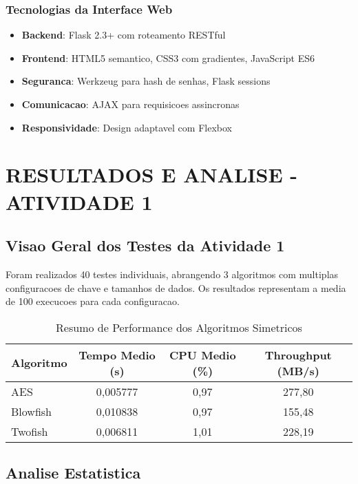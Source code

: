 \documentclass[12pt,a4paper,oneside]{article}
\begin{document}
\subsubsection{Tecnologias da Interface Web}

\begin{itemize}
    \item \textbf{Backend}: Flask 2.3+ com roteamento RESTful
    \item \textbf{Frontend}: HTML5 semantico, CSS3 com gradientes, JavaScript ES6
    \item \textbf{Seguranca}: Werkzeug para hash de senhas, Flask sessions
    \item \textbf{Comunicacao}: AJAX para requisicoes assincronas
    \item \textbf{Responsividade}: Design adaptavel com Flexbox
\end{itemize}

\section{RESULTADOS E ANALISE - ATIVIDADE 1}

\subsection{Visao Geral dos Testes da Atividade 1}

Foram realizados 40 testes individuais, abrangendo 3 algoritmos com multiplas configuracoes de chave e tamanhos de dados. Os resultados representam a media de 100 execucoes para cada configuracao.

\begin{table}[H]
\centering
\caption{Resumo de Performance dos Algoritmos Simetricos}
\label{tab:performance}
\begin{tabular}{lccc}
\toprule
\textbf{Algoritmo} & \textbf{Tempo Medio (s)} & \textbf{CPU Medio (\%)} & \textbf{Throughput (MB/s)} \\
\midrule
AES & 0,005777 & 0,97 & 277,80 \\
Blowfish & 0,010838 & 0,97 & 155,48 \\
Twofish & 0,006811 & 1,01 & 228,19 \\
\bottomrule
\end{tabular}
\end{table}

\subsection{Analise Estatistica}
\end{document}
